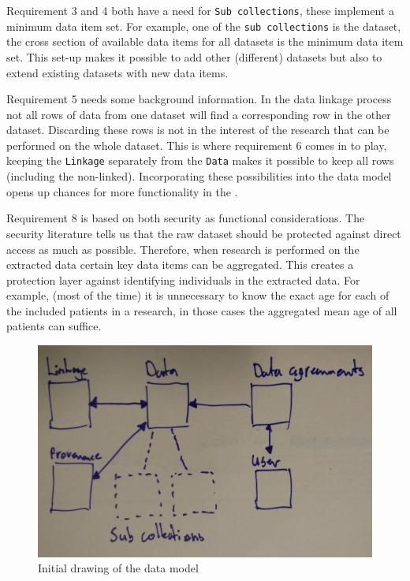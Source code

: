 Requirement 3 and 4 both have a need for {\tt Sub collections}, these implement a minimum data item set.
For example, one of the {\tt sub collections} is the \IVF{} dataset, the cross section of available data items for all \IVF{} datasets is the minimum data item set.
This set-up makes it possible to add other (different) datasets but also to extend existing datasets with new data items.

Requirement 5 needs some background information.
In the data linkage process not all rows of data from one dataset will find a corresponding row in the other dataset.
Discarding these rows is not in the interest of the research that can be performed on the whole dataset.
This is where requirement 6 comes in to play, keeping the {\tt Linkage} separately from the {\tt Data} makes it possible to keep all rows (including the non-linked).
Incorporating these possibilities into the data model opens up chances for more functionality in the \ivfsystem{}.

Requirement 8 is based on both security as functional considerations.
The security literature tells us that the raw dataset should be protected against direct access as much as possible.
Therefore, when research is performed on the extracted data certain key data items can be aggregated.
This creates a protection layer against identifying individuals in the extracted data.
For example, (most of the time) it is unnecessary to know the exact age for each of the included patients in a research, in those cases the aggregated mean age of all patients can suffice.

\begin{figure}[b]
	\centering
	\includegraphics[width=1.0\linewidth]{images/small-structure-v2}
	\caption{Initial drawing of the data model} %
	\label{fig:model-drawing}
\end{figure}

